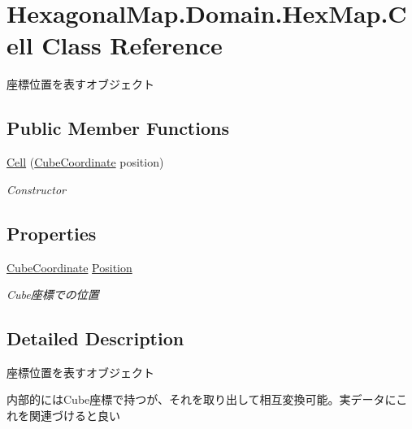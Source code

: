 \hypertarget{class_hexagonal_map_1_1_domain_1_1_hex_map_1_1_cell}{}\section{Hexagonal\+Map.\+Domain.\+Hex\+Map.\+Cell Class Reference}
\label{class_hexagonal_map_1_1_domain_1_1_hex_map_1_1_cell}


座標位置を表すオブジェクト  


\subsection*{Public Member Functions}
\begin{DoxyCompactItemize}
\item 
\mbox{\hyperlink{class_hexagonal_map_1_1_domain_1_1_hex_map_1_1_cell_a1508e9283829797d14a33ea1f945e6bc}{Cell}} (\mbox{\hyperlink{struct_hexagonal_map_1_1_domain_1_1_hex_map_1_1_cube_coordinate}{Cube\+Coordinate}} position)
\begin{DoxyCompactList}\small\item\em Constructor \end{DoxyCompactList}\end{DoxyCompactItemize}
\subsection*{Properties}
\begin{DoxyCompactItemize}
\item 
\mbox{\hyperlink{struct_hexagonal_map_1_1_domain_1_1_hex_map_1_1_cube_coordinate}{Cube\+Coordinate}} \mbox{\hyperlink{class_hexagonal_map_1_1_domain_1_1_hex_map_1_1_cell_a4012ce403bf927c7f693b4e6db8a878a}{Position}}
\begin{DoxyCompactList}\small\item\em Cube座標での位置 \end{DoxyCompactList}\end{DoxyCompactItemize}


\subsection{Detailed Description}
座標位置を表すオブジェクト 

内部的には\+Cube座標で持つが、それを取り出して相互変換可能。実データにこれを関連づけると良い

